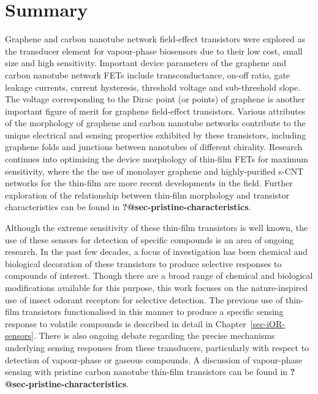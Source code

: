 \documentclass[
  a4paper,
]{scrbook}
\begin{document}
\hypertarget{summary}{%
\section{Summary}\label{summary}}

Graphene and carbon nanotube network field-effect transistors were
explored as the transducer element for vapour-phase biosensors due to
their low cost, small size and high sensitivity. Important device
parameters of the graphene and carbon nanotube network FETs include
transconductance, on-off ratio, gate leakage currents, current
hysteresis, threshold voltage and sub-threshold slope. The voltage
corresponding to the Dirac point (or points) of graphene is another
important figure of merit for graphene field-effect transistors. Various
attributes of the morphology of graphene and carbon nanotube networks
contribute to the unique electrical and sensing properties exhibited by
these transistors, including graphene folds and junctions between
nanotubes of different chirality. Research continues into optimising the
device morphology of thin-film FETs for maximum sensitivity, where the
the use of monolayer graphene and highly-purified s-CNT networks for the
thin-film are more recent developments in the field. Further exploration
of the relationship between thin-film morphology and transistor
characteristics can be found in \textbf{?@sec-pristine-characteristics}.

Although the extreme sensitivity of these thin-film transistors is well
known, the use of these sensors for detection of specific compounds is
an area of ongoing research. In the past few decades, a focus of
investigation has been chemical and biological decoration of these
transistors to produce selective responses to compounds of interest.
Though there are a broad range of chemical and biological modifications
available for this purpose, this work focuses on the nature-inspired use
of insect odorant receptors for selective detection. The previous use of
thin-film transistors functionalised in this manner to produce a
specific sensing response to volatile compounds is described in detail
in Chapter~\ref{sec-iOR-sensors}. There is also ongoing debate regarding
the precise mechanisms underlying sensing responses from these
transducers, particularly with respect to detection of vapour-phase or
gaseous compounds. A discussion of vapour-phase sensing with pristine
carbon nanotube thin-film transistors can be found in
\textbf{?@sec-pristine-characteristics}.

\end{document}
